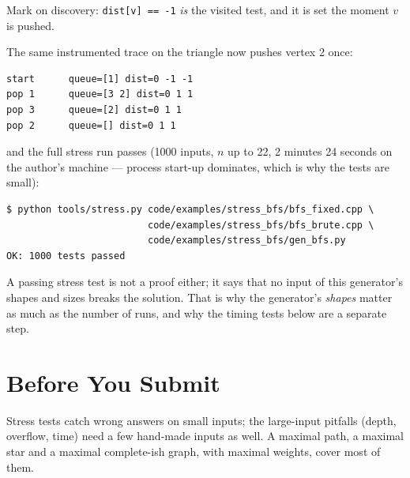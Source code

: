 Mark on discovery: \texttt{dist[v] == -1} \emph{is} the visited test, and it is set the moment $v$ is pushed.



The same instrumented trace on the triangle now pushes vertex 2 once:

\begin{lstlisting}[style=trace]
start      queue=[1] dist=0 -1 -1
pop 1      queue=[3 2] dist=0 1 1
pop 3      queue=[2] dist=0 1 1
pop 2      queue=[] dist=0 1 1
\end{lstlisting}

and the full stress run passes (1000 inputs, $n$ up to 22, 2 minutes 24 seconds on the author's machine --- process start-up dominates, which is why the tests are small):

\begin{lstlisting}[style=trace]
$ python tools/stress.py code/examples/stress_bfs/bfs_fixed.cpp \
                         code/examples/stress_bfs/bfs_brute.cpp \
                         code/examples/stress_bfs/gen_bfs.py
OK: 1000 tests passed
\end{lstlisting}

A passing stress test is not a proof either; it says that no input of this generator's shapes and sizes breaks the solution. That is why the generator's \emph{shapes} matter as much as the number of runs, and why the timing tests below are a separate step.

\clneed
\section{Before You Submit}
\label{sec:ts-checklist}

Stress tests catch wrong answers on small inputs; the large-input pitfalls (depth, overflow, time) need a few hand-made inputs as well. A maximal path, a maximal star and a maximal complete-ish graph, with maximal weights, cover most of them.

